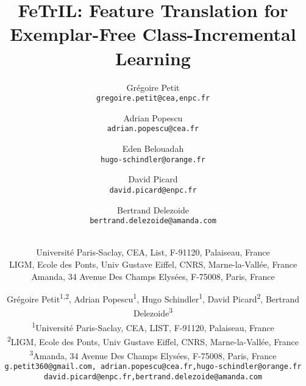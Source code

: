 \documentclass[10pt,twocolumn,letterpaper]{article}
\begin{document}
\title{FeTrIL: Feature Translation for Exemplar-Free Class-Incremental Learning}


\author{
    Grégoire Petit   \\{\tt\small gregoire.petit@cea,enpc.fr} \and 
    Adrian Popescu     \\{\tt\small adrian.popescu@cea.fr}          \and 
    Eden Belouadah     \\{\tt\small hugo-schindler@orange.fr}               \and 
    David Picard       \\{\tt\small david.picard@enpc.fr}           \and 
    Bertrand Delezoide \\{\tt\small bertrand.delezoide@amanda.com}  \and   \\
    Université Paris-Saclay, CEA, List, F-91120, Palaiseau, France\\
    LIGM, Ecole des Ponts, Univ Gustave Eiffel, CNRS, Marne-la-Vallée, France\\
     Amanda, 34 Avenue Des Champs Elysées, F-75008, Paris, France
}

\author{
Grégoire Petit\textsuperscript{1,2}, 
Adrian Popescu\textsuperscript{1}, 
Hugo Schindler\textsuperscript{1}, 
David Picard\textsuperscript{2},
Bertrand Delezoide\textsuperscript{3}\\
 \textsuperscript{1}Université Paris-Saclay, CEA, LIST, F-91120, Palaiseau, France\\
 \textsuperscript{2}LIGM, Ecole des Ponts, Univ Gustave Eiffel, CNRS, Marne-la-Vallée, France\\
 \textsuperscript{3}Amanda, 34 Avenue Des Champs Elysées, F-75008, Paris, France\\
{\tt\small g.petit360@gmail.com, adrian.popescu@cea.fr,hugo-schindler@orange.fr}\\
{\tt\small david.picard@enpc.fr,bertrand.delezoide@amanda.com}
}


\maketitle
\thispagestyle{empty}
\end{document}
